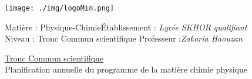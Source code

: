 \documentclass[12pt]{article}
\newcommand\headerMe[2]{\noindent{}#1\hfill#2}
\begin{document}
\begin{center}
\texttt{[image: ./img/logoMin.png]}
\vspace{-3cm}
\end{center}
\headerMe{Matière : Physique-Chimie}{Établissement : \emph{Lycée SKHOR qualifiant}}\\
\headerMe{ Niveau : Tronc Commun scientifique }{  Professeur :\emph{Zakaria Haouzan}}\\

\begin{center}
	\vspace{0.5cm}
\underline{Tronc Commun scientifique }\\
\hrulefill
\Large{Planification annuelle
du programme de la matière chimie physique}
\hrulefill\\
\end{center}
\end{document}
